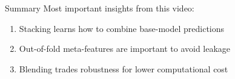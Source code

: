 \documentclass[main]{subfiles}
\begin{document}
\begin{frame}{Summary}
Most important insights from this video:
\begin{enumerate}
    \item Stacking learns how to combine base-model predictions
    \item Out-of-fold meta-features are important to avoid leakage
    \item Blending trades robustness for lower computational cost
\end{enumerate}
\end{frame}
\end{document}
